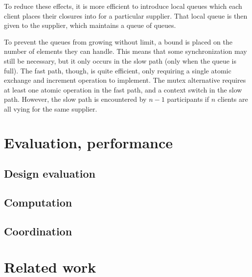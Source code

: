 \documentclass[a4]{article}
\begin{document}
To reduce these effects,
it is more efficient to introduce local queues which each client
places their closures into for a particular supplier.
That local queue is then given to the supplier,
which maintains a queue of queues.
\begin{center}
\end{center}
To prevent the queues from growing without limit,
a bound is placed on the number of elements they can handle.
This means that some synchronization may still be necessary,
but it only occurs in the slow path (only when the queue is full).
The fast path, though, is quite efficient,
only requiring a single atomic exchange and increment operation
to implement.
The mutex alternative requires at least one atomic operation in the fast path,
and a context switch in the slow path.
However, the slow path is encountered by $n - 1$ participants if
$n$ clients are all vying for the same supplier.

\section{Evaluation, performance}

\subsection{Design evaluation}

\subsection{Computation}

\subsection{Coordination}

\section{Related work}
\end{document}
